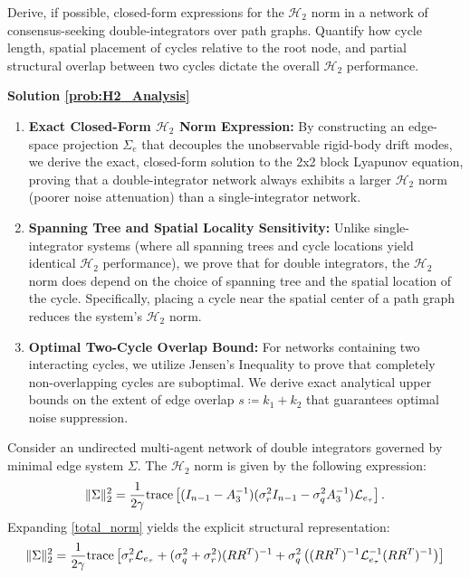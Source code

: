\documentclass[openright,twoside]{iitbthesis}
\begin{document}
\begin{problem}\label{prob:H2_Analysis}
    Derive, if possible, closed-form expressions for the $\mathcal{H}_2$ norm in a network of consensus-seeking double-integrators over path graphs. Quantify how cycle length, spatial placement of cycles relative to the root node, and partial structural overlap between two cycles dictate the overall $\mathcal{H}_2$ performance. 
\end{problem}
\noindent \textbf{Solution \ref{prob:H2_Analysis}}
\begin{enumerate}
    \item \textbf{Exact Closed-Form $\mathcal{H}_2$ Norm Expression:} By constructing an edge-space projection $\Sigma_e$ that decouples the unobservable rigid-body drift modes, we derive the exact, closed-form solution to the 2x2 block Lyapunov equation, proving that a double-integrator network always exhibits a larger $\mathcal{H}_2$ norm (poorer noise attenuation) than a single-integrator network.
    \item \textbf{Spanning Tree and Spatial Locality Sensitivity:} Unlike single-integrator systems (where all spanning trees and cycle locations yield identical $\mathcal{H}_2$ performance), we prove that for double integrators, the $\mathcal{H}_2$ norm does depend on the choice of spanning tree and the spatial location of the cycle. Specifically, placing a cycle near the spatial center of a path graph reduces the system's $\mathcal{H}_2$ norm.
    \item \textbf{Optimal Two-Cycle Overlap Bound:} For networks containing two interacting cycles, we utilize Jensen's Inequality to prove that completely non-overlapping cycles are suboptimal. We derive exact analytical upper bounds on the extent of edge overlap $s \coloneqq  k_1 + k_2$ that guarantees optimal noise suppression.
\end{enumerate}
\begin{theo}\label{theoH2}
\leavevmode\par\noindent
Consider an undirected multi-agent network of double integrators governed by minimal edge system $\Sigma$. The $\mathcal{H}_2$ norm is given by the following expression:
\begin{equation}\label{total_norm}
	\|\Sigma\|_2^2 = \frac{1}{2\gamma} \text{trace}\left[ (I_{n-1} - A_3^{-1}) (\sigma_r^2 I_{n-1} - \sigma_q^2 A_3^{-1}) \mathcal{L}_{e_{\tau}} \right].
\end{equation}
Expanding \eqref{total_norm} yields the explicit structural representation:
\begin{equation}\label{total_norm_expanded}
	\|\Sigma\|_2^2 = \frac{1}{2\gamma} \text{trace}\left[ \sigma_r^2 \mathcal{L}_{e_{\tau}} + (\sigma_q^2 + \sigma_r^2) (RR^T)^{-1} + \sigma_q^2 \left( (RR^T)^{-1} \mathcal{L}_{e_{\tau}}^{-1} (RR^T)^{-1} \right) \right]
\end{equation}
\end{theo}
\end{document}
